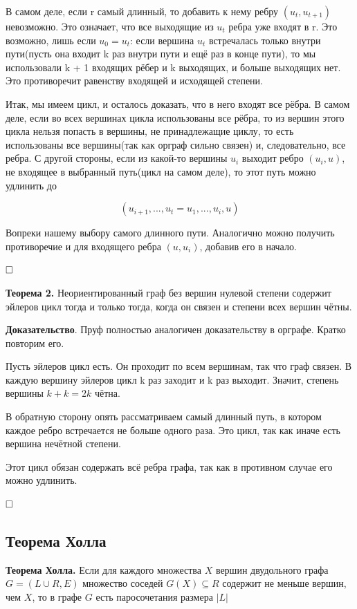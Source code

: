 \documentclass[a4paper, 10pt]{article}
\begin{document}
В самом деле, если r самый длинный, то добавить к нему ребру $(u_t, u_{t+1})$ невозможно. Это означает, что все выходящие из $u_t$ ребра уже входят в r. Это возможно, лишь если $u_0 = u_t$: если вершина $u_t$ встречалась только внутри пути(пусть она входит k раз внутри пути и ещё раз в конце пути), то мы использовали k + 1 входящих рёбер и k выходящих, и больше выходящих нет. Это противоречит равенству входящей и исходящей степени.

Итак, мы имеем цикл, и осталось доказать, что в него входят все рёбра. В самом деле, если во всех вершинах цикла использованы все рёбра, то из вершин этого цикла нельзя попасть в вершины, не принадлежащие циклу, то есть использованы все вершины(так как орграф сильно связен) и, следовательно, все ребра. С другой стороны, если из какой-то вершины $u_i$ выходит ребро $(u_i, u)$, не входящее в выбранный путь(цикл на самом деле), то этот путь можно удлинить до

$$(u_{i + 1}, ... , u_t = u_1, ..., u_i, u)$$ 

Вопреки нашему выбору самого длинного пути. Аналогично можно получить противоречие и для входящего ребра $(u, u_i)$, добавив его в начало.

$\hfill \square$

\medskip

\textbf{Теорема 2.} Неориентированный граф без вершин нулевой степени содержит эйлеров цикл тогда и только тогда, когда он связен и степени всех вершин чётны.

\medskip

\textbf{Доказательство}. Пруф полностью аналогичен доказательству в орграфе. Кратко повторим его.

Пусть эйлеров цикл есть. Он проходит по всем вершинам, так что граф связен. В каждую вершину эйлеров цикл k раз заходит и k раз выходит. Значит, степень вершины $k+k=2k$ чётна.

В обратную сторону опять рассматриваем самый длинный путь, в котором каждое ребро встречается не больше одного раза. Это цикл, так как иначе есть вершина нечётной степени.

Этот цикл обязан содержать всё ребра графа, так как в противном случае его можно удлинить.

$\hfill \square$


\subsection{Теорема Холла}

\textbf{Теорема Холла.} Если для каждого множества $X$ вершин двудольного графа $G = (L \cup R, E)$ множество соседей $G(X) \subseteq R$ содержит не меньше вершин, чем $X$, то в графе $G$ есть паросочетания размера $|L|$ 
\end{document}
